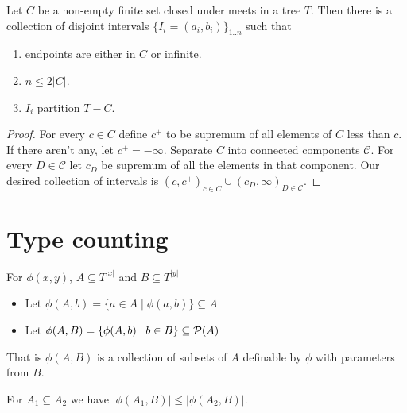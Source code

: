 \documentclass{amsart}
\begin{document}
\begin{Lemma} \label{lm_partition}
	Let $C$ be a non-empty finite set closed under meets in a tree $T$. Then there is a collection of disjoint intervals $\{I_i = (a_i, b_i)\}_{1..n}$ such that
	\begin{enumerate}
		\item endpoints are either in $C$ or infinite.
		\item $n \leq 2|C|$.
		\item $I_i$ partition $T - C$.
	\end{enumerate}
\end{Lemma}

\begin{proof}
	For every $c \in C$ define $c^+$ to be supremum of all elements of $C$ less than $c$. If there aren't any, let $c^+ = -\infty$. Separate $C$ into connected components $\mathcal C$. For every $D \in \mathcal C$ let $c_D$ be supremum of all the elements in that component. Our desired collection of intervals is $(c, c^+)_{c \in C} \cup (c_D, \infty)_{D \in \mathcal C}$.
\end{proof}

\section{Type counting}

\begin{Definition} For $\phi(x, y)$, $A \subseteq T^{|x|}$ and $B \subseteq T^{|y|}$
\begin{itemize}
	\item Let $\phi(A, b) = \{a \in A \mid \phi(a, b)\} \subseteq A$
	\item Let $\phi(A, B) = \{\phi(A, b) \mid b \in B\} \subseteq \mathcal P(A)$	
\end{itemize}
\end{Definition}
That is $\phi(A, B)$ is a collection of subsets of $A$ definable by $\phi$ with parameters from $B$.

\begin{Note}
	For $A_1 \subseteq A_2$ we have $|\phi(A_1, B)| \leq |\phi(A_2, B)|$.
\end{Note}
\end{document}
